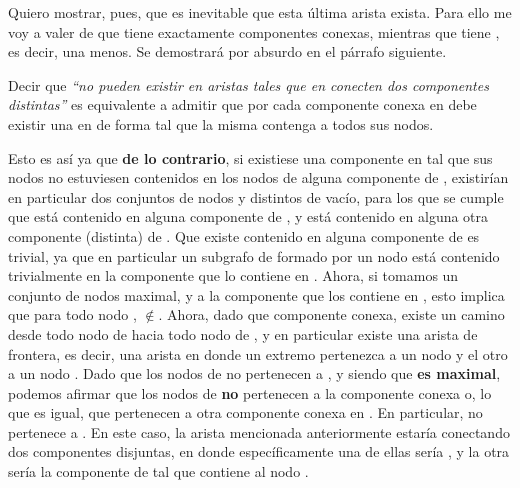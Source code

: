 \documentclass[11pt, a4paper, twoside]{article}
\begin{document}
\begin{paragraph}
Quiero mostrar, pues, que es inevitable que esta última arista exista. Para
ello me voy a valer de que  tiene exactamente 
componentes conexas, mientras que  tiene ,
es decir, una menos. Se demostrará por absurdo en el párrafo siguiente.

\begin{proposicion}

Decir que \emph{``no pueden existir en  aristas tales que en
 conecten dos componentes distintas''} es equivalente a admitir
que por cada componente conexa en  debe existir una en
 de forma tal que la misma contenga a todos sus nodos. 

\end{proposicion}

\begin{demostracion}

Esto es así ya que \textbf{de lo contrario}, si existiese una componente
 en  tal que sus nodos no estuviesen
contenidos en los nodos de alguna componente de , existirían
en particular dos conjuntos de nodos  y
 distintos de vacío, para los que se
cumple que  está contenido en alguna componente de
, y  está contenido en alguna otra componente
(distinta) de . Que existe  contenido en
alguna componente de  es trivial, ya que en particular un
subgrafo de  formado por un nodo está contenido trivialmente
en la componente que lo contiene en . Ahora, si tomamos
 un conjunto de nodos maximal, y  a la
componente que los contiene en , esto implica que para todo
nodo ,
$\notin$. Ahora, dado que  componente conexa, existe un camino desde todo nodo de
 hacia todo nodo de , y en particular existe
una arista de frontera, es decir, una arista 
en donde un extremo pertenezca a un nodo  y el otro
a un nodo . Dado que los nodos de 
no pertenecen a , y siendo que  \textbf{es
maximal}, podemos afirmar que los nodos de  \textbf{no}
pertenecen a la componente conexa  o, lo que es igual, que
pertenecen a otra componente conexa en . En particular,
 no pertenece a . En este caso, la arista
 mencionada anteriormente estaría conectando dos componentes
disjuntas, en donde específicamente una de ellas sería ,
y la otra sería la componente de  tal que contiene
al nodo .


\end{demostracion}
\end{paragraph}
\end{document}

